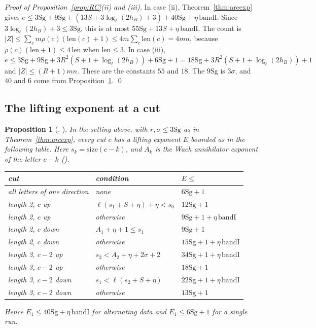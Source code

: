 \documentclass[11pt]{article}
\newcommand{\Sg}{\mathrm{Sg}}
\newtheorem{prop}[lemma]{Proposition}
\theoremstyle{definition}
\theoremstyle{remark}
\begin{document}
\noindent\emph{Proof of Proposition~\ref{prop:RC}(ii) and (iii).} In case (ii), Theorem~\ref{thm:arcexp} gives $e\le3\Sg+9\Sg+(13S+3\log_\ell(2h_B)+3)+40\Sg+\eta\,\mathrm{bandI}$. Since $3\log_\ell(2h_B)+3\le3\Sg$, this is at most $55\Sg+13S+\eta\,\mathrm{bandI}$. The count is $\lvert Z\rvert\le\sum_cm\rho(c)(\mathrm{len}(c)+1)\le4m\sum_c\mathrm{len}(c)=4mn$, because $\rho(c)(\mathrm{len}+1)\le4\,\mathrm{len}$ when $\mathrm{len}\le3$. In case (iii), $e\le3\Sg+9\Sg+3R^2(S+1+\log_\ell(2h_B))+6\Sg+1=18\Sg+3R^2(S+1+\log_\ell(2h_B))+1$ and $\lvert Z\rvert\le(R+1)mn$. These are the constants $55$ and $18$. The $9\Sg$ is $3\sigma$, and $40$ and $6$ come from Proposition~\ref{prop:cutlift}. \qed

\subsection*{The lifting exponent at a cut}

\begin{prop}[, ]\label{prop:cutlift}
In the setting above, with $r,\sigma\le3\Sg$ as in Theorem~\ref{thm:arcexp}, every cut $c$ has a lifting exponent $E$ bounded as in the following table. Here $s_k=\mathrm{size}(c-k)$, and $A_k$ is the Wach annihilator exponent of the letter $c-k$ ().
\begin{center}\small
\begin{tabular}{@{}lll@{}}
\toprule
cut & condition & $E\le$\\
\midrule
all letters of one direction & none & $6\Sg+1$\\
length 2, $c$ up & $\ell(s_1+S+\eta)+\eta<s_0$ & $12\Sg+1$\\
length 2, $c$ up & otherwise & $9\Sg+1+\eta\,\mathrm{bandI}$\\
length 2, $c$ down & $A_1+\eta+1\le s_1$ & $9\Sg+1$\\
length 2, $c$ down & otherwise & $15\Sg+1+\eta\,\mathrm{bandI}$\\
length 3, $c-2$ up & $s_2<A_2+\eta+2\sigma+2$ & $34\Sg+1+\eta\,\mathrm{bandI}$\\
length 3, $c-2$ up & otherwise & $18\Sg+1$\\
length 3, $c-2$ down & $s_1<\ell(s_2+S+\eta)$ & $22\Sg+1+\eta\,\mathrm{bandI}$\\
length 3, $c-2$ down & otherwise & $13\Sg+1$\\
\bottomrule
\end{tabular}
\end{center}
Hence $E_1\le40\Sg+\eta\,\mathrm{bandI}$ for alternating data and $E_1\le6\Sg+1$ for a single run.
\end{prop}
\end{document}
